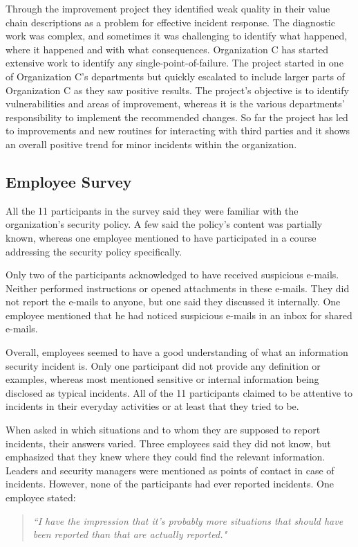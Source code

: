 Through the improvement project they identified weak quality in their value chain descriptions as a problem for effective incident response. The diagnostic work was complex, and sometimes it was challenging to identify what happened, where it happened and with what consequences. Organization C has started extensive work to identify any single-point-of-failure. The project started in one of Organization C's departments but quickly escalated to include larger parts of Organization C as they saw positive results. The project's objective is to identify vulnerabilities and areas of improvement, whereas it is the various departments' responsibility to implement the recommended changes. So far the project has led to improvements and new routines for interacting with third parties and it shows an overall positive trend for minor incidents within the organization. 

\subsection{Employee Survey}
All the 11 participants in the survey said they were familiar with the organization's security policy. A few said the policy's content was partially known, whereas one employee mentioned to have participated in a course addressing the security policy specifically.

Only two of the participants acknowledged to have received suspicious e-mails. Neither performed instructions or opened attachments in these e-mails. They did not report the e-mails to anyone, but one said they discussed it internally. One employee mentioned that he had noticed suspicious e-mails in an inbox for shared e-mails. 

Overall, employees seemed to have a good understanding of what an information security incident is. Only one participant did not provide any definition or examples, whereas most mentioned sensitive or internal information being disclosed as typical incidents. All of the 11 participants claimed to be attentive to incidents in their everyday activities or at least that they tried to be.

When asked in which situations and to whom they are supposed to report incidents, their answers varied. Three employees said they did not know, but emphasized that they knew where they could find the relevant information. Leaders and security managers were mentioned as points of contact in case of incidents. However, none of the participants had ever reported incidents. One employee stated: 
\begin{quote}
\textit{``I have the impression that it's probably more situations that should have been reported than that are actually reported."}
\end{quote}

